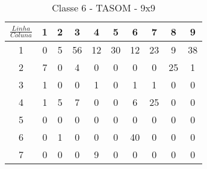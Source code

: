 \begin{table}[]
\centering
\caption{Classe 6 - TASOM - 9x9}
\label{my-label}
\begin{tabular}{|c|c|c|c|c|c|c|c|c|c|}
\hline
\rowcolor[HTML]{FFFFFF} 
$\frac{Linha}{Coluna}$    & 1                         & 2                         & 3                         & 4                         & 5  & 6                          & 7                          & 8                          & 9                         \\ \hline
\rowcolor[HTML]{34CDF9} 
\cellcolor[HTML]{FFFFFF}1 & \cellcolor[HTML]{FFFFFF}0 & 5                         & 56                        & 12                        & 30 & 12                         & 23                         & 9                          & 38                        \\ \hline
\rowcolor[HTML]{FFFFFF} 
2                         & \cellcolor[HTML]{34CDF9}7 & 0                         & 4                         & 0                         & 0  & 0                          & 0                          & \cellcolor[HTML]{34CDF9}25 & \cellcolor[HTML]{34CDF9}1 \\ \hline
\rowcolor[HTML]{FFFFFF} 
3                         & \cellcolor[HTML]{34CDF9}1 & 0                         & 0                         & \cellcolor[HTML]{34CDF9}1 & 0  & \cellcolor[HTML]{34CDF9}1  & \cellcolor[HTML]{34CDF9}1  & 0                          & 0                         \\ \hline
\rowcolor[HTML]{FFFFFF} 
4                         & \cellcolor[HTML]{34CDF9}1 & \cellcolor[HTML]{34CDF9}5 & \cellcolor[HTML]{34CDF9}7 & 0                         & 0  & 6                          & \cellcolor[HTML]{34CDF9}25 & 0                          & 0                         \\ \hline
\rowcolor[HTML]{FFFFFF} 
5                         & 0                         & 0                         & 0                         & 0                         & 0  & 0                          & 0                          & 0                          & 0                         \\ \hline
\rowcolor[HTML]{FFFFFF} 
6                         & 0                         & \cellcolor[HTML]{34CDF9}1 & 0                         & 0                         & 0  & \cellcolor[HTML]{34CDF9}40 & 0                          & 0                          & 0                         \\ \hline
\rowcolor[HTML]{FFFFFF} 
7                         & 0                         & 0                         & 0                         & 9                         & 0  & 0                          & 0                          & 0                          & 0                         \\ \hline

\end{tabular}
\end{table}

